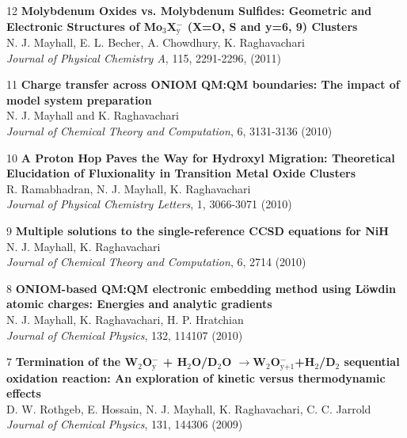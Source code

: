 \documentclass[10pt]{article}
\newenvironment{lonelist}[1][\enskip\textbullet]%
        {\vspace{-\baselineskip}\begin{list}{#1}{%
        \setlength{\partopsep}{0pt}%
        \setlength{\topsep}{0pt}}}
        {\end{list}\vspace{-.6\baselineskip}}
\begin{document}
\begin{lonelist}
\item[12\hspace{4pt}] \textbf{Molybdenum Oxides vs. Molybdenum Sulfides: Geometric and Electronic Structures of Mo$_3$X$_\text{y}^−$ (X=O, S and y=6, 9) Clusters}\\
N. J. Mayhall, E. L. Becher, A. Chowdhury, K. Raghavachari\\
\textsl{Journal of Physical Chemistry A}, 115, 2291-2296, (2011)

\item[11\hspace{4pt}] \textbf{Charge transfer across ONIOM QM:QM boundaries: The impact of model system preparation}\\
N. J. Mayhall and K. Raghavachari\\
 \textsl{Journal of Chemical Theory and Computation}, 6, 3131-3136 (2010)

\item[10\hspace{4pt}] \textbf{A Proton Hop Paves the Way for Hydroxyl Migration: Theoretical Elucidation of Fluxionality in Transition Metal Oxide Clusters}\\
R. Ramabhadran, N. J. Mayhall, K. Raghavachari\\
\textsl{Journal of Physical Chemistry Letters}, 1, 3066-3071 (2010)

\item[9\hspace{4pt}] \textbf{Multiple solutions to the single-reference CCSD equations for NiH}\\
N. J. Mayhall, K. Raghavachari\\
\textsl{Journal of Chemical Theory and Computation}, 6, 2714 (2010)

\item[8\hspace{4pt}] \textbf{ONIOM-based QM:QM electronic embedding method using L\"owdin atomic charges: Energies and analytic gradients}\\
N. J. Mayhall, K. Raghavachari, H. P. Hratchian\\
\textsl{Journal of Chemical Physics}, 132, 114107 (2010)

\item[7\hspace{4pt}] \textbf{Termination of the W$_2$O$_\text{y}^-$ + H$_2$O/D$_2$O $\rightarrow$W$_2$O$_{\text{y+1}}^-$+H$_2$/D$_2$ sequential oxidation reaction: An exploration of kinetic versus thermodynamic effects}\\
D. W. Rothgeb, E. Hossain, N. J. Mayhall, K. Raghavachari, C. C. Jarrold\\
\textsl{Journal of Chemical Physics}, 131, 144306 (2009)



\end{lonelist}
\end{document}
